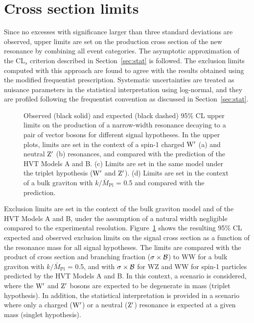 \section{Cross section limits}

Since no excesses with significance larger than three standard deviations are observed, upper limits are set on the production cross section of the new resonance by combining all event categories.
The asymptotic approximation of the $\mathrm{CL}_s$ criterion described in Section~\ref{sec:stat} is followed.
The exclusion limits computed with this approach are found to agree with the results obtained using the modified frequentist prescription.
Systematic uncertainties are treated as nuisance parameters in the statistical interpretation using log-normal, and they are profiled following the frequentist convention as discussed in Section~\ref{sec:stat}.

\begin{figure}[!htb]
\centering
{}
\caption{Observed (black solid) and expected (black dashed) 95\% CL upper limits on the production of a narrow-width resonance decaying to a pair of vector bosons for different signal hypotheses.
In the upper plots, limits are set in the context of a spin-1 charged $\mathrm{W}^\prime$ (a) and neutral $\mathrm{Z}^\prime$ (b) resonances, and compared with the prediction of the HVT Models A and B.
(c) Limits are set in the same model under the triplet hypothesis ($\mathrm{W}^\prime$ and $\mathrm{Z}^\prime$). (d) Limits are set in the context of a bulk graviton with $k/\bar{M}_\mathrm{Pl}$ = 0.5 and compared with the prediction.
}
\label{fig:limitsAsympt-WV}
\end{figure}

Exclusion limits are set in the context of the bulk graviton model and of the HVT Models A and B, under the assumption of a natural width negligible compared to the experimental resolution.
Figure~\ref{fig:limitsAsympt-WV} shows the resulting 95\% CL expected and observed exclusion limits on the signal cross section as a function of the resonance mass for all signal hypotheses.
The limits are compared with the product of cross section and branching fraction ($\sigma\times\cal{B}$) to WW for a bulk graviton with $k/\bar{M}_\mathrm{Pl}$ = 0.5,
and with $\sigma\times\cal{B}$ for WZ and WW for spin-1 particles predicted by the HVT Models A and B.
In this context, a scenario is considered, where the $\mathrm{W}^\prime$ and $\mathrm{Z}^\prime$ bosons are expected to be degenerate in mass (triplet hypothesis).
In addition, the statistical interpretation is provided in a scenario where only a charged ($\mathrm{W}^\prime$) or a neutral ($\mathrm{Z}^\prime$) resonance is expected at a given mass (singlet hypothesis).

